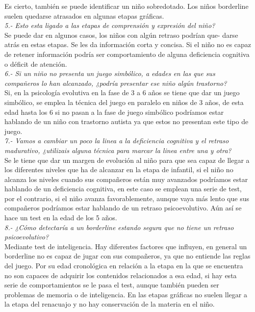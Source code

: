 \documentclass[letterpaper,12pt]{article}
\begin{document}
Es cierto, también se puede identificar un niño sobredotado. Los niños
borderline suelen quedarse atrasados en algunas etapas gráficas. \\

\textit{5.- Esto esta ligado a las etapas de comprensión y expresión del niño?} \\
Se puede dar en algunos casos, los niños con algún retraso podrían que-
darse atrás en estas etapas. Se les da información corta y concisa. Si el niño
no es capaz de retener información podría ser comportamiento de alguna
deficiencia cognitiva o déficit de atención. \\

\textit{6.- Si un niño no presenta un juego simbólico, a edades en las que sus
compañeros lo han alcanzado, ¿podría presentar ese niño algún trastorno?} \\

Si, en la psicología evolutiva en la fase de 3 a 6 años se tiene que dar un
juego simbólico, se emplea la técnica del juego en paralelo en niños de 3 años, de esta edad hasta los 6 si no pasan a la fase de juego simbólico podríamos estar hablando de un niño con trastorno autista ya que estos no presentan este tipo de juego. \\

\textit{7.- Vamos a cambiar un poco la linea a la deficiencia cognitiva y el retraso madurativo, ¿utilizais alguna técnica para marcar la linea entre una y otra?} \\

Se le tiene que dar un margen de evolución al niño para que sea capaz
de llegar a los diferentes niveles que ha de alcanzar en la etapa de infantil, si el niño no alcanza los niveles cuando sus compañeros están muy avanzados
podríamos estar hablando de un deficiencia cognitiva, en este caso se emplean
una serie de test, por el contrario, si el niño avanza favorablemente, aunque
vaya más lento que sus compañeros podríamos estar hablando de un retraso
psicoevolutivo.
Aún así se hace un test en la edad de los 5 años. \\

\textit{8.- ¿Cómo detectaría a un borderline estando segura que no tiene un retraso psicoevolutivo?} \\

Mediante test de inteligencia. Hay diferentes factores que influyen, en
general un borderline no es capaz de jugar con sus compañeros, ya que no
entiende las reglas del juego. Por su edad cronológica en relación a la etapa
en la que se encuentra no son capaces de adquirir los contenidos relacionados
a esa edad, si hay esta serie de comportamientos se le pasa el test, aunque
también pueden ser problemas de memoria o de inteligencia. En las etapas
gráficas no suelen llegar a la etapa del renacuajo y no hay conservación de la
materia en el niño. \\
\end{document}
